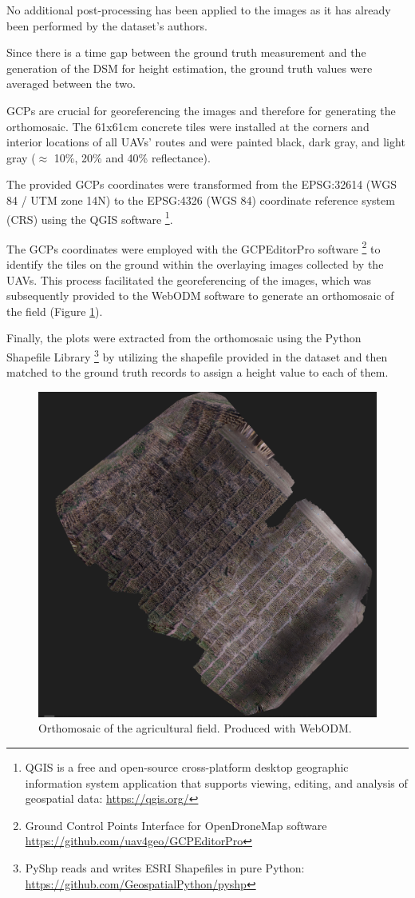 No additional post-processing has been applied to the images as it has already been performed by the dataset's authors.

Since there is a time gap between the ground truth measurement and the generation of the DSM for height estimation, the ground truth values were averaged between the two.

GCPs are crucial for georeferencing the images and therefore for generating the orthomosaic. The 61x61cm concrete tiles were installed at the corners and interior locations of all UAVs' routes and were painted black, dark gray, and light gray ($\approx$ 10\%, 20\% and 40\% reflectance).

The provided GCPs coordinates were transformed from the EPSG:32614 (WGS 84 / UTM zone 14N) to the EPSG:4326 (WGS 84) coordinate reference system (CRS) using the QGIS software \footnote{QGIS is a free and open-source cross-platform desktop geographic information system application that supports viewing, editing, and analysis of geospatial data: \url{https://qgis.org/}}.

The GCPs coordinates were employed with the GCPEditorPro software \footnote{Ground Control Points Interface for OpenDroneMap software \url{https://github.com/uav4geo/GCPEditorPro}} to identify the tiles on the ground within the overlaying images collected by the UAVs. This process facilitated the georeferencing of the images, which was subsequently provided to the WebODM software to generate an orthomosaic of the field (Figure \ref{fig:orthomosaic}).

Finally, the plots were extracted from the orthomosaic using the Python Shapefile Library \footnote{PyShp reads and writes ESRI Shapefiles in pure Python: \url{https://github.com/GeospatialPython/pyshp}} by utilizing the shapefile provided in the dataset and then matched to the ground truth records to assign a height value to each of them.

\begin{figure}[b!]
\includegraphics[width=\linewidth]{../images/orthomosaic}
\caption{Orthomosaic of the agricultural field. Produced with WebODM.}
\label{fig:orthomosaic}
\end{figure}